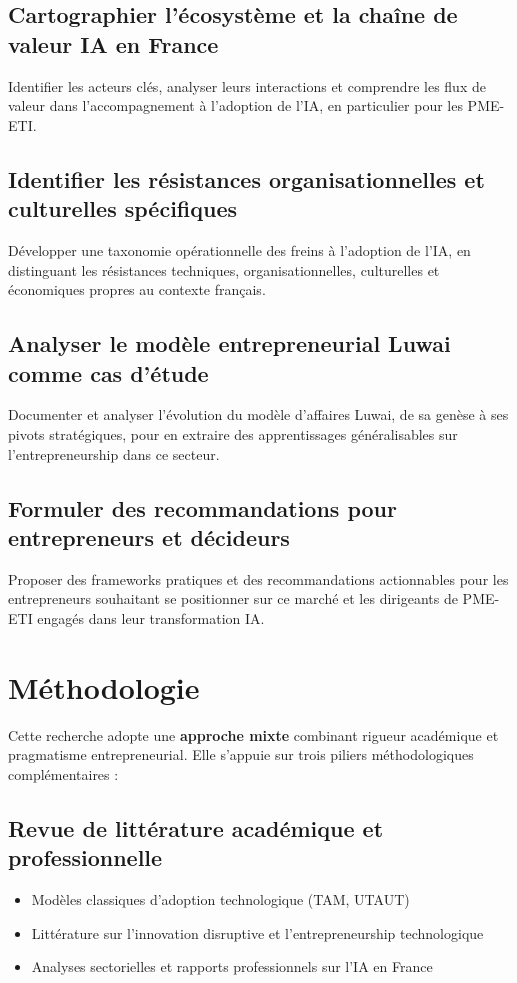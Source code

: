 \subsection{Cartographier l'écosystème et la chaîne de valeur IA en France}
Identifier les acteurs clés, analyser leurs interactions et comprendre les flux de valeur dans l'accompagnement à l'adoption de l'IA, en particulier pour les PME-ETI.

\subsection{Identifier les résistances organisationnelles et culturelles spécifiques}
Développer une taxonomie opérationnelle des freins à l'adoption de l'IA, en distinguant les résistances techniques, organisationnelles, culturelles et économiques propres au contexte français.

\subsection{Analyser le modèle entrepreneurial Luwai comme cas d'étude}
Documenter et analyser l'évolution du modèle d'affaires Luwai, de sa genèse à ses pivots stratégiques, pour en extraire des apprentissages généralisables sur l'entrepreneurship dans ce secteur.

\subsection{Formuler des recommandations pour entrepreneurs et décideurs}
Proposer des frameworks pratiques et des recommandations actionnables pour les entrepreneurs souhaitant se positionner sur ce marché et les dirigeants de PME-ETI engagés dans leur transformation IA.

\section{Méthodologie}

Cette recherche adopte une \textbf{approche mixte} combinant rigueur académique et pragmatisme entrepreneurial. Elle s'appuie sur trois piliers méthodologiques complémentaires :

\subsection{Revue de littérature académique et professionnelle}
\begin{itemize}
    \item Modèles classiques d'adoption technologique (TAM, UTAUT)
    \item Littérature sur l'innovation disruptive et l'entrepreneurship technologique
    \item Analyses sectorielles et rapports professionnels sur l'IA en France
\end{itemize}

